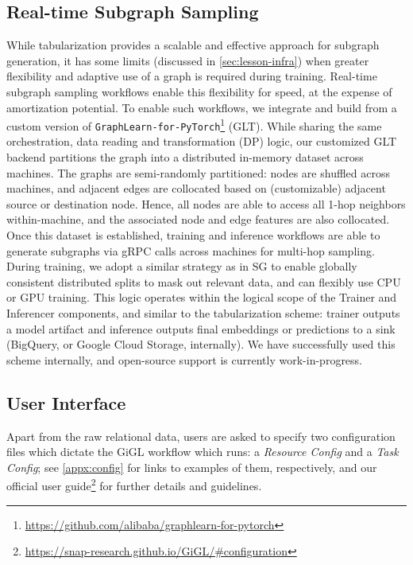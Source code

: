 \subsection{Real-time Subgraph Sampling}
\label{sec:glt}
While tabularization provides a scalable and effective approach for subgraph generation, it has some limits (discussed in \cref{sec:lesson-infra}) when greater flexibility and adaptive use of a graph is required during training.  Real-time subgraph sampling workflows enable this flexibility for speed, at the expense of amortization potential.  To enable such workflows, we integrate and build from a custom version of {\small\texttt{GraphLearn-for-PyTorch}}\footnote{\url{https://github.com/alibaba/graphlearn-for-pytorch}} (GLT).  While sharing the same orchestration, data reading and transformation (DP) logic, our customized GLT backend partitions the graph into a distributed in-memory dataset across machines.  The graphs are semi-randomly partitioned: nodes are shuffled across machines, and adjacent edges are collocated based on (customizable) adjacent source or destination node.  Hence, all nodes are able to access all 1-hop neighbors within-machine, and the associated node and edge features are also collocated.  Once this dataset is established, training and inference workflows are able to generate subgraphs via gRPC calls across machines for multi-hop sampling.  During training, we adopt a similar strategy as in SG to enable globally consistent distributed splits to mask out relevant data, and can flexibly use CPU or GPU training.  This logic operates within the logical scope of the Trainer and Inferencer components, and similar to the tabularization scheme: trainer outputs a model artifact and inference outputs final embeddings or predictions to a sink (BigQuery, or Google Cloud Storage, internally). We have successfully used this scheme internally, and open-source support is currently work-in-progress. 




\subsection{User Interface}
\label{sec:interface}
Apart from the raw relational data, users are asked to specify two configuration files which dictate the GiGL workflow which runs: a \emph{Resource Config} and a \emph{Task Config}; see \cref{appx:config} for links to examples of them, respectively, and our official user guide\footnote{\url{https://snap-research.github.io/GiGL/\#configuration}} for further details and guidelines.


